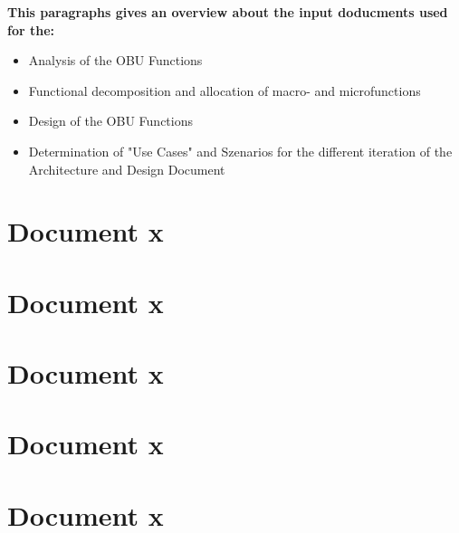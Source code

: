 \textbf{This paragraphs gives an overview about the input doducments used for the:}
\begin{itemize}
\item Analysis of the OBU Functions
\item Functional decomposition and allocation of macro- and microfunctions
\item Design of the OBU Functions
\item Determination of "Use Cases" and Szenarios for the different iteration of the Architecture and Design Document
\end{itemize}

\section{Document x}

\section{Document x}

\section{Document x}

\section{Document x}

\section{Document x}